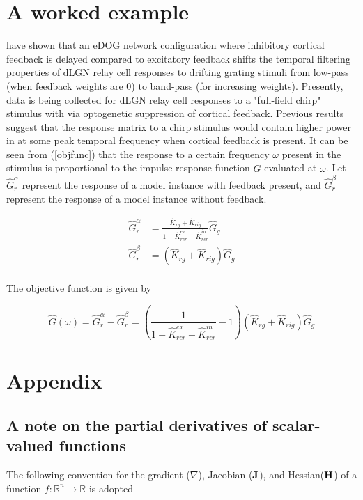 \documentclass{article}
\newcommand{\R}{\mathbb{R}}
\newcommand{\vect}[1]{\textbf{\textrm{#1}}}
\begin{document}
\section{A worked example}
\cite{mobarhan2018} have shown that an eDOG network configuration where inhibitory cortical feedback is delayed compared to excitatory feedback shifts the temporal filtering properties of dLGN relay cell responses to drifting grating stimuli from low-pass (when feedback weights are 0) to band-pass (for increasing weights). Presently, data is being collected for dLGN relay cell responses to a "full-field chirp" stimulus with via optogenetic suppression of cortical feedback. Previous results \citep{mobarhan2018} suggest that the response matrix to a chirp stimulus would contain higher power in at some peak temporal frequency when cortical feedback is present. It can be seen from (\ref{objfunc}) that the response to a certain frequency $\omega$ present in the stimulus is proportional to the impulse-response function $\hat{G}$ evaluated at $\omega$. Let $\hat{G}_r^\alpha$ represent the response of a model instance with feedback present, and $\hat{G}_r^\beta$ represent the response of a model instance without feedback.

\begin{align*}
	\hat{G}_r^\alpha & = \frac{\hat{K}_{rg} + \hat{K}_{rig}}
					   {1 - \hat{K}_{rcr}^{ex} - \hat{K}_{rcr}^{in}} \hat{G}_g \\
	\hat{G}_r^\beta & = \left( \hat{K}_{rg} + \hat{K}_{rig} \right) \hat{G}_g \\
\end{align*}

The objective function is given by

\begin{equation}
	\hat{G}(\omega) = \hat{G}_r^\alpha - \hat{G}_r^\beta = 
	\left( \frac{1}{1 - \hat{K}_{rcr}^{ex} - \hat{K}_{rcr}^{in}} - 1 \right)
	\left( \hat{K}_{rg} + \hat{K}_{rig} \right) \hat{G}_g
\end{equation}

\yel{[...]}

\section{Appendix} \label{appendix}

\subsection{A note on the partial derivatives of scalar-valued functions}
The following convention for the gradient ($\nabla$), Jacobian ($\vect{J}$), and Hessian($\vect{H}$) of a function $f: \R^n \rightarrow \R$ is adopted
\end{document}
